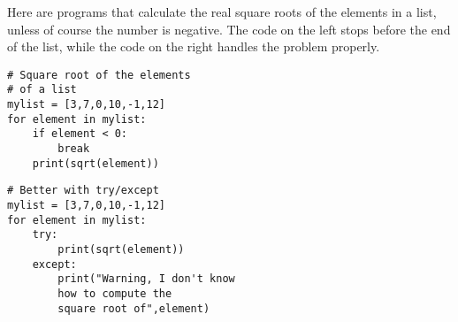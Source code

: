 \documentclass[11pt,class=report,crop=false]{standalone}
\begin{document}
\begin{cours}
\begin{exemple}

Here are programs that calculate the real square roots of the elements in a list, unless of course the number is negative. The code on the left stops before the end of the list, while the code on the right handles the problem properly. 

\begin{minipage}{0.4\textwidth}
\begin{lstlisting}
# Square root of the elements
# of a list
mylist = [3,7,0,10,-1,12]
for element in mylist:
    if element < 0:
        break
    print(sqrt(element))
\end{lstlisting}
\end{minipage}\qquad\quad
\begin{minipage}{0.4\textwidth}
\begin{lstlisting}
# Better with try/except
mylist = [3,7,0,10,-1,12]
for element in mylist:
    try: 
        print(sqrt(element))
    except:
        print("Warning, I don't know 
        how to compute the 
        square root of",element)
\end{lstlisting}
\end{minipage}
\end{exemple}


\end{cours}
\end{document}
